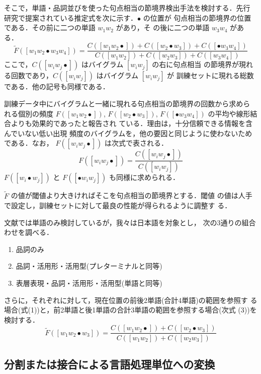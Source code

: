 そこで，単語・品詞並びを使った句点相当の節境界検出手法を検討する．先行
研究\cite{Lavie96}で提案されている推定式を次に示す．$\bullet$ の位置が
句点相当の節境界の位置である．その前に二つの単語 $w_1 w_2$ があり，そ
の後に二つの単語 $w_3 w_4$ がある．
\begin{equation}
\tilde{F}([w_1 w_2 \bullet w_3 w_4])=\frac
 {C([w_1 w_2 \bullet])+C([w_2 \bullet w_3])+C([\bullet w_3 w_4])}
 {C([w_1 w_2])+C([w_2 w_3])+C([w_3 w_4])}
\end{equation}
ここで，$C([w_i w_j \bullet])$ はバイグラム $[w_i w_j]$ の右に句点相当
の節境界が現れる回数であり，$C([w_i w_j])$ はバイグラム $[w_i w_j]$ が
訓練セットに現れる総数である．他の記号も同様である．

訓練データ中にバイグラムと一緒に現れる句点相当の節境界の回数から求めら
れる個別の頻度 $F([w_1 w_2 \bullet])$, $F([w_2 \bullet w_3])$,
$F([\bullet w_3 w_4])$ の平均や線形結合よりも効果的であったと報告され
ている\cite{Lavie96}．理由は，十分信頼できる情報を含んでいない低い出現
頻度のバイグラムを，他の要因と同じように使わないためである．なお，
$F([w_i w_j \bullet])$ は次式で表される．
\begin{equation}
F([w_i w_j \bullet])=\frac{C([w_i w_j \bullet])}{C([w_i w_j])}
\end{equation}
$F([w_i \bullet w_j])$ と $F([\bullet w_i w_j])$ も同様に求められる．

$\tilde{F}$ の値が閾値より大きければそこを句点相当の節境界とする．閾値
の値は人手で設定し，訓練セットに対して最良の性能が得られるように調整す
る．

文献\cite{Lavie96}では単語のみ検討しているが，我々は日本語を対象とし，
次の3通りの組合わせを調べる．
\begin{enumerate}
\item 品詞のみ
\item 品詞・活用形・活用型(プレターミナル\cite{Takezawa96}と同等)
\item 表層表現・品詞・活用形・活用型(単語と同等)
\end{enumerate}
さらに，それぞれに対して，現在位置の前後2単語(合計4単語)の範囲を参照す
る場合(式(1))と，前2単語と後1単語の合計3単語の範囲を参照する場合(次式
(3))を検討する．
\begin{equation}
\tilde{F}([w_1 w_2 \bullet w_3])=\frac
 {C([w_1 w_2 \bullet])+C([w_2 \bullet w_3])}
 {C([w_1 w_2])+C([w_2 w_3])}
\end{equation}

\vspace{-3mm}
\subsection{分割または接合による言語処理単位への変換}
\vspace{-1mm}

